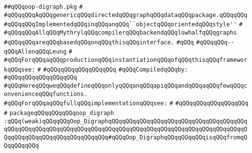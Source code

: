 \label{src/lib/graph/oop-digraph.pkg}
\verb|##qQQqoop-digraph.pkg|\newline
\verb|#|\newline
\verb|#qQQqqQQqAqQQqgenericqQQqdirectedqQQqgraphqQQqdataqQQqpackage.qQQqqQQq|\newline
\verb|#qQQqqQQqImplementedqQQqinqQQqanqQQq``objectqQQqorientedqQQqstyle''|\newline
\verb|#|\newline
\verb|#qQQqqQQqAllqQQqMythrylqQQqcompilerqQQqbackendqQQqlowhalfqQQqgraphs|\newline
\verb|#qQQqqQQqareqQQqbasedqQQqonqQQqthisqQQqinterface.|\newline
\verb|#qQQq|\newline
\verb|#qQQqqQQq--qQQqAllenqQQqLeung|\newline
\verb|#|\newline
\verb|#qQQqForqQQqaqQQqproductionqQQqinstantiationqQQqofqQQqthisqQQqframeworkqQQqsee:|\newline
\verb|#|\newline
\verb|#qQQqqQQqqQQqqQQqqQQq|\newline
\newline
\verb|#qQQqCompiledqQQqby:|\newline
\verb|#qQQqqQQqqQQqqQQqqQQq|\newline
\newline
\verb|#qQQqHereqQQqweqQQqdefineqQQqonlyqQQqanqQQqapiqQQqandqQQqaqQQqfewqQQqconvenienceqQQqfunctions.|\newline
\verb|#qQQqForqQQqaqQQqfullqQQqimplementationqQQqsee:|\newline
\verb|#|\newline
\verb|#qQQqqQQqqQQqqQQqqQQq|\newline
\verb|#|\newline
\verb|packageqQQqqQQqqQQqoop_digraph|\newline
\verb|:qQQq(weak)qQQqqQQqOop_DigraphqQQqqQQqqQQqqQQqqQQqqQQqqQQqqQQqqQQqqQQqqQQqqQQqqQQqqQQqqQQqqQQqqQQqqQQqqQQqqQQqqQQqqQQqqQQqqQQqqQQqqQQqqQQqqQQqqQQqqQQqqQQqqQQqqQQqqQQqqQQq#qQQqOop_DigraphqQQqqQQqqQQqisqQQqfromqQQqqQQqqQQq|\newline
